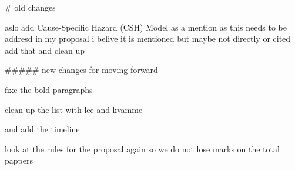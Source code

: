 # old changes

aslo add Cause-Specific Hazard (CSH) Model as a mention as this needs to be addresd in my proposal i belive it is mentioned but maybe not directly or cited add that and clean up


##### new changes for moving forward



fixe the bold paragraphs

clean up the list with lee and kvamme 


and add the timeline 


look at the rules for the proposal again so we do not lose marks on the total pappers 
